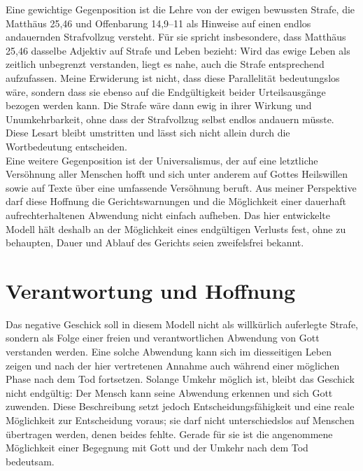 Eine gewichtige Gegenposition ist die Lehre von der ewigen bewussten Strafe, die Matthäus 25,46 und Offenbarung 14,9--11 als Hinweise auf einen endlos andauernden Strafvollzug versteht. Für sie spricht insbesondere, dass Matthäus 25,46 dasselbe Adjektiv auf Strafe und Leben bezieht: Wird das ewige Leben als zeitlich unbegrenzt verstanden, liegt es nahe, auch die Strafe entsprechend aufzufassen. Meine Erwiderung ist nicht, dass diese Parallelität bedeutungslos wäre, sondern dass sie ebenso auf die Endgültigkeit beider Urteilsausgänge bezogen werden kann. Die Strafe wäre dann ewig in ihrer Wirkung und Unumkehrbarkeit, ohne dass der Strafvollzug selbst endlos andauern müsste. Diese Lesart bleibt umstritten und lässt sich nicht allein durch die Wortbedeutung entscheiden.
\\

Eine weitere Gegenposition ist der Universalismus, der auf eine letztliche Versöhnung aller Menschen hofft und sich unter anderem auf Gottes Heilswillen sowie auf Texte über eine umfassende Versöhnung beruft. Aus meiner Perspektive darf diese Hoffnung die Gerichtswarnungen und die Möglichkeit einer dauerhaft aufrechterhaltenen Abwendung nicht einfach aufheben. Das hier entwickelte Modell hält deshalb an der Möglichkeit eines endgültigen Verlusts fest, ohne zu behaupten, Dauer und Ablauf des Gerichts seien zweifelsfrei bekannt.

\section{Verantwortung und Hoffnung}

Das negative Geschick soll in diesem Modell nicht als willkürlich auferlegte Strafe, sondern als Folge einer freien und verantwortlichen Abwendung von Gott verstanden werden. Eine solche Abwendung kann sich im diesseitigen Leben zeigen und nach der hier vertretenen Annahme auch während einer möglichen Phase nach dem Tod fortsetzen. Solange Umkehr möglich ist, bleibt das Geschick nicht endgültig: Der Mensch kann seine Abwendung erkennen und sich Gott zuwenden. Diese Beschreibung setzt jedoch Entscheidungsfähigkeit und eine reale Möglichkeit zur Entscheidung voraus; sie darf nicht unterschiedslos auf Menschen übertragen werden, denen beides fehlte. Gerade für sie ist die angenommene Möglichkeit einer Begegnung mit Gott und der Umkehr nach dem Tod bedeutsam.
\\

